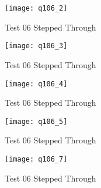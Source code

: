 			\begin{figure}[position = here]
				\begin{centering}
					\texttt{[image: q106\_2]}\\
					\caption[\textit{RPYAxes}]{Test 06 Stepped Through}
				\end{centering}
			\end{figure}
			\newline			
		
			\begin{figure}[position = here]
				\begin{centering}
					\texttt{[image: q106\_3]}\\
					\caption[\textit{RPYAxes}]{Test 06 Stepped Through}
				\end{centering}
			\end{figure}
			\newline			
			
			\begin{figure}[position = here]
				\begin{centering}
					\texttt{[image: q106\_4]}\\
					\caption[\textit{RPYAxes}]{Test 06 Stepped Through}
				\end{centering}
			\end{figure}
			\newline			
			
			\begin{figure}[position = here]
				\begin{centering}
					\texttt{[image: q106\_5]}\\
					\caption[\textit{RPYAxes}]{Test 06 Stepped Through}
				\end{centering}
			\end{figure}
			\newline			
			
			\begin{figure}[position = here]
				\begin{centering}
					\texttt{[image: q106\_6]}\\
					\caption[\textit{RPYAxes}]Test 06 Stepped Through}
				\end{centering}
			\end{figure}
			\newline								
			
			\begin{figure}[position = here]
				\begin{centering}
					\texttt{[image: q106\_7]}\\
					\caption[\textit{RPYAxes}]{Test 06 Stepped Through}
				\end{centering}
			\end{figure}
			\newline										

